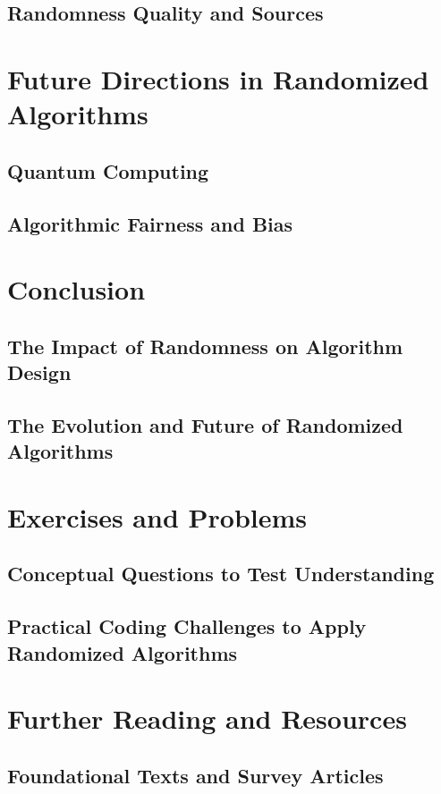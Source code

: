 \documentclass[12pt]{book} %
\begin{document}
\subsection{Randomness Quality and Sources}

\section{Future Directions in Randomized Algorithms}
\subsection{Quantum Computing}
\subsection{Algorithmic Fairness and Bias}

\section{Conclusion}
\subsection{The Impact of Randomness on Algorithm Design}
\subsection{The Evolution and Future of Randomized Algorithms}

\section{Exercises and Problems}
\subsection{Conceptual Questions to Test Understanding}
\subsection{Practical Coding Challenges to Apply Randomized Algorithms}

\section{Further Reading and Resources}
\subsection{Foundational Texts and Survey Articles}
\end{document}
